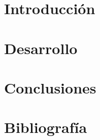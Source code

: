 \documentclass[a4paper,10pt]{article}
\begin{document}

\newpage
\tableofcontents
\newpage


\section{Introducción} 
\label{sec:intro}

\section{Desarrollo}
\label{sec:desarrollo}
%

\section{Conclusiones}
\label{sec:conclusiones}
%


\section{Bibliografía}
\end{document}
